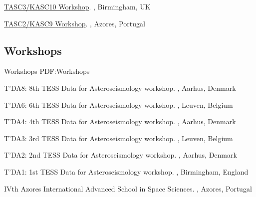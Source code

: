 \documentclass[letterpaper,10pt,oneside]{article}
\begin{document}
\begin{body}
\GapNoBreak
\BulletItem
\href{https://www.tasc3kasc10.com/}{TASC3/KASC10 Workshop}. , Birmingham, UK

\GapNoBreak
\BulletItem
\href{http://www.iastro.pt/research/conferences/spacetk16/}{TASC2/KASC9 Workshop}. , Azores, Portugal

\BigGap
\subsection
{Workshops}
{Workshops}
{PDF:Workshops}

\GapNoBreak
\BulletItem
T'DA8: 8th TESS Data for Asteroseismology workshop. , Aarhus, Denmark

\GapNoBreak
\BulletItem
T'DA6: 6th TESS Data for Asteroseismology workshop. , Leuven, Belgium

\GapNoBreak
\BulletItem
T'DA4: 4th TESS Data for Asteroseismology workshop. , Aarhus, Denmark

\GapNoBreak
\BulletItem
T'DA3: 3rd TESS Data for Asteroseismology workshop. , Leuven, Belgium

\GapNoBreak
\BulletItem
T'DA2: 2nd TESS Data for Asteroseismology workshop. , Aarhus, Denmark

\GapNoBreak
\BulletItem
T'DA1: 1st TESS Data for Asteroseismology workshop. , Birmingham, England

\GapNoBreak
\BulletItem
IVth Azores International Advanced School in Space Sciences. , Azores, Portugal






\end{body}
\end{document}
